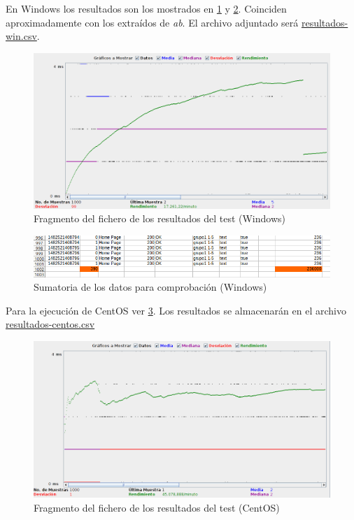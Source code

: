 En Windows los resultados son los mostrados en \ref{cuestion4-10} y \ref{cuestion4-11}. Coinciden aproximadamente con los extraídos de \textit{ab}. El archivo adjuntado será \url{resultados-win.csv}.

\begin{figure}[H]
	\centering
	\includegraphics[scale=0.4]{cuestion4-10.png}
	\caption{Fragmento del fichero de los resultados del test (Windows)} \label{cuestion4-10}
\end{figure}

\begin{figure}[H]
	\centering
	\includegraphics[scale=0.6]{cuestion4-11.png}
	\caption{Sumatoria de los datos para comprobación (Windows)} \label{cuestion4-11}
\end{figure}

Para la ejecución de CentOS ver \ref{cuestion4-12}. Los resultados se almacenarán en el archivo \url{resultados-centos.csv}

\begin{figure}[H]
	\centering
	\includegraphics[scale=0.4]{cuestion4-12.png}
	\caption{Fragmento del fichero de los resultados del test (CentOS)} \label{cuestion4-12}
\end{figure}

